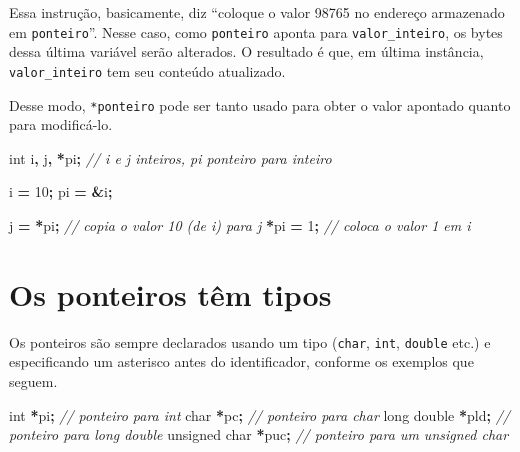 \documentclass[
  11pt,
  a4paper,
]{scrbook}
\newenvironment{Shaded}{\begin{snugshade}}{\end{snugshade}}
\newcommand{\CommentTok}[1]{\textcolor[rgb]{0.56,0.35,0.01}{\textit{#1}}}
\newcommand{\DataTypeTok}[1]{\textcolor[rgb]{0.13,0.29,0.53}{#1}}
\newcommand{\DecValTok}[1]{\textcolor[rgb]{0.00,0.00,0.81}{#1}}
\newcommand{\NormalTok}[1]{#1}
\newcommand{\OperatorTok}[1]{\textcolor[rgb]{0.81,0.36,0.00}{\textbf{#1}}}
\begin{document}
Essa instrução, basicamente, diz ``coloque o valor 98765 no endereço
armazenado em \texttt{ponteiro}''. Nesse caso, como \texttt{ponteiro}
aponta para \texttt{valor\_inteiro}, os bytes dessa última variável
serão alterados. O resultado é que, em última instância,
\texttt{valor\_inteiro} tem seu conteúdo atualizado.

Desse modo, \texttt{*ponteiro} pode ser tanto usado para obter o valor
apontado quanto para modificá-lo.

\begin{Shaded}
\begin{Highlighting}[]
\DataTypeTok{int}\NormalTok{ i}\OperatorTok{,}\NormalTok{ j}\OperatorTok{,} \OperatorTok{*}\NormalTok{pi}\OperatorTok{;}  \CommentTok{// i e j inteiros, pi ponteiro para inteiro}

\NormalTok{i }\OperatorTok{=} \DecValTok{10}\OperatorTok{;}
\NormalTok{pi }\OperatorTok{=} \OperatorTok{\&}\NormalTok{i}\OperatorTok{;}

\NormalTok{j }\OperatorTok{=} \OperatorTok{*}\NormalTok{pi}\OperatorTok{;}  \CommentTok{// copia o valor 10 (de i) para j}
\OperatorTok{*}\NormalTok{pi }\OperatorTok{=} \DecValTok{1}\OperatorTok{;}  \CommentTok{// coloca o valor 1 em i}
\end{Highlighting}
\end{Shaded}

\section{Os ponteiros têm tipos}\label{os-ponteiros-tuxeam-tipos}

Os ponteiros são sempre declarados usando um tipo (\texttt{char},
\texttt{int}, \texttt{double} etc.) e especificando um asterisco antes
do identificador, conforme os exemplos que seguem.

\begin{Shaded}
\begin{Highlighting}[]
\DataTypeTok{int} \OperatorTok{*}\NormalTok{pi}\OperatorTok{;}  \CommentTok{// ponteiro para int}
\DataTypeTok{char} \OperatorTok{*}\NormalTok{pc}\OperatorTok{;}  \CommentTok{// ponteiro para char}
\DataTypeTok{long} \DataTypeTok{double} \OperatorTok{*}\NormalTok{pld}\OperatorTok{;}  \CommentTok{// ponteiro para long double}
\DataTypeTok{unsigned} \DataTypeTok{char} \OperatorTok{*}\NormalTok{puc}\OperatorTok{;}  \CommentTok{// ponteiro para um unsigned char}
\end{Highlighting}
\end{Shaded}
\end{document}
